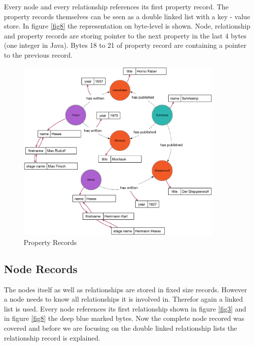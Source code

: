 Every node and every relationship references its first property record. The property records themselves can be seen as a double linked list with a key - value store. In figure \ref{fig8} the representation on byte-level is shown. Node, relationship and property records are storing pointer to the next property in the last 4 bytes (one integer in Java). Bytes 18 to 21 of property record are containing a pointer to the previous record.


\begin{figure}
	\centering
 	 	\includegraphics[width=0.9\textwidth]{images/nextProperty.eps}
	\caption{Property Records}
	\label{fig2}
\end{figure}

\subsection{Node Records}
The nodes itself as well as relationships are stored in fixed size records. However a node needs to know all relationships it is involved in. Therefor again a linked list is used. Every node references its first relationship shown in figure \ref{fig3} and in figure \ref{fig8} the deep blue marked bytes.
Now the complete node recored was covered and before we are focusing on the double linked relationship lists the relationship record is explained.

